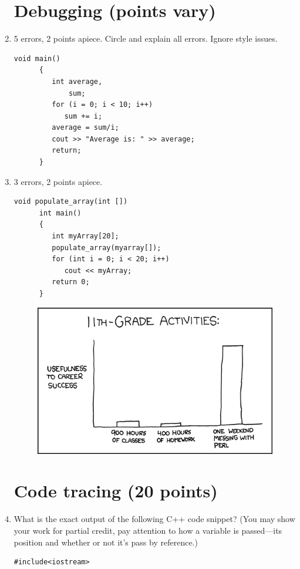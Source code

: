 \documentclass[letterpaper,12pt]{article}
\begin{document}
\begin{enumerate}
\section*{Debugging (points vary)}
   \item 5 errors, 2 points apiece. Circle and explain all errors. Ignore style issues.
      \begin{lstlisting}[basicstyle=\footnotesize\ttfamily]
      void main()
      {
         int average,
             sum;
         for (i = 0; i < 10; i++)
            sum += i;
         average = sum/i;
         cout >> "Average is: " >> average;
         return;
      }
      \end{lstlisting}
   \item 3 errors, 2 points apiece.
      \begin{lstlisting}[basicstyle=\footnotesize\ttfamily]
      void populate_array(int [])
      int main()
      {
         int myArray[20];
         populate_array(myarray[]);
         for (int i = 0; i < 20; i++)
            cout << myArray;
         return 0;
      }
      \end{lstlisting}

\begin{figure}[ht!]
	\centering
	\includegraphics[width=5in]{11th_grade.png}
\end{figure}
\newpage

\section*{Code tracing (20 points)}
   \item What is the exact output of the following C++ code snippet?
      (You may show your work for partial credit, pay attention to how a variable is passed—its position and whether or not it’s pass by reference.)
   \begin{lstlisting}[basicstyle=\footnotesize\ttfamily]
      #include<iostream>


\end{lstlisting}
\end{enumerate}
\end{document}
